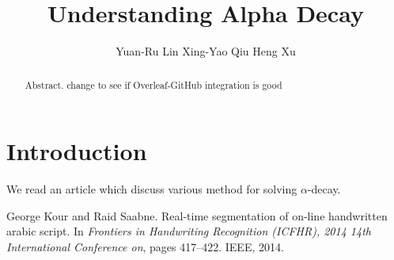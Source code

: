 \documentclass{article}
\title{Understanding Alpha Decay}
\author{
  Yuan-Ru Lin
   \And
  Xing-Yao Qiu
   \And
  Heng Xu
}
\begin{document}
\maketitle

\begin{abstract}
Abstract. change to see if Overleaf-GitHub integration is good
\end{abstract}

\section{Introduction}
We read an article which discuss various method for solving $\alpha$-decay. \cite{understandingAlphaDecay}


  
\begin{thebibliography}{1}
George Kour and Raid Saabne.
\newblock Real-time segmentation of on-line handwritten arabic script.
\newblock In {\em Frontiers in Handwriting Recognition (ICFHR), 2014 14th
  International Conference on}, pages 417--422. IEEE, 2014.

\end{thebibliography}
\end{document}
